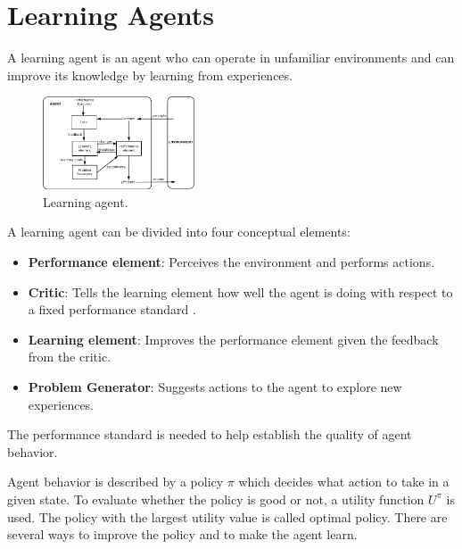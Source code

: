 \section{Learning Agents}
A learning agent is an agent who can operate in unfamiliar environments and can improve its knowledge by learning from experiences.

\begin{figure}[ht]
    \centering
    \includegraphics[width=0.4\textwidth]{images/IntelligentAgent-Learning.png}
    \caption{Learning agent.}
\end{figure}

\noindent
A learning agent can be divided into four conceptual elements:
\begin{itemize}
    \item \textbf{Performance element}: Perceives the environment and performs actions.
    \item \textbf{Critic}: Tells the learning element how well the agent is doing with respect to a fixed performance standard \cite{russell2002artificial}.
    \item \textbf{Learning element}: Improves the performance element given the feedback from the critic.
    \item \textbf{Problem Generator}: Suggests actions to the agent to explore new experiences.
\end{itemize}
The performance standard is needed to help establish the quality of agent behavior.

\vspace*{4mm}
\noindent
Agent behavior is described by a policy $\pi$ which decides what action to take in a given state.
To evaluate whether the policy is good or not, a utility function $U^{\pi}$ is used.
The policy with the largest utility value is called optimal policy.
There are several ways to improve the policy and to make the agent learn.
